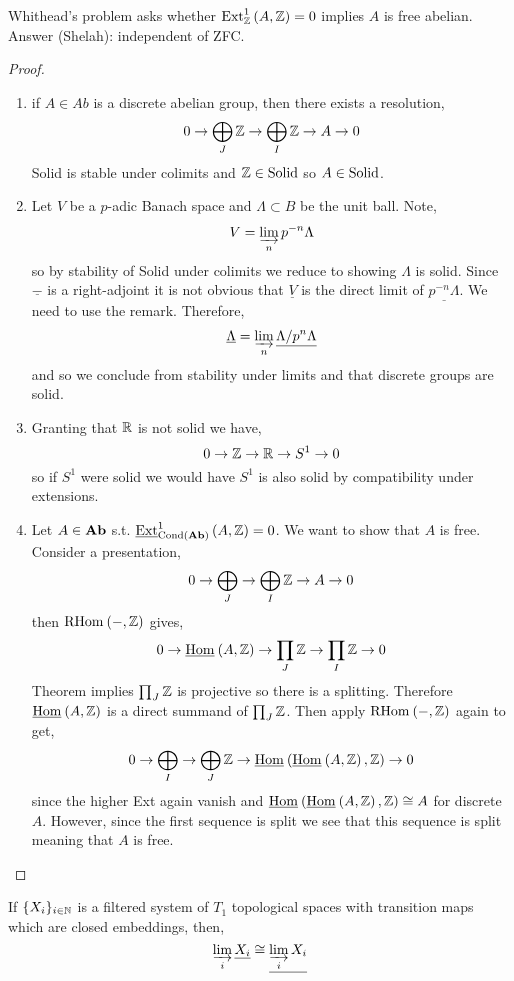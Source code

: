 \documentclass[12pt]{article}
\newcommand{\Cond}{\mathrm{Cond}}
\begin{document}
\begin{rmk}
Whithead's problem asks whether $\mathrm{Ext}^{1}_{\mathbb{Z}} \left( A, \mathbb{Z} \right) = 0$ implies $A$ is free abelian. Answer (Shelah): independent of ZFC. 
\end{rmk}

\begin{proof}
\begin{enumerate}
\item if $A \in Ab$ is a discrete abelian group, then there exists a resolution,
\[ 0 \to \bigoplus_J \mathbb{Z} \to \bigoplus_I \mathbb{Z} \to A \to 0 \]
Solid is stable under colimits and $\mathbb{Z} \in \mathrm{Solid}$ so $A \in \mathrm{Solid}$.

\item Let $V$ be a $p$-adic Banach space and $\Lambda \subset B$ be the unit ball. Note,
\[ V = \operatorname*{\varinjlim}_n p^{-n} \Lambda \]
so by stability of Solid under colimits we reduce to showing $\Lambda$ is solid. Since $\underline{-}$ is a right-adjoint it is not obvious that $\underline{V}$ is the direct limit of $\underline{p^{-n} \Lambda}$. We need to use the remark. Therefore, 
\[ \underline{\Lambda} = \operatorname*{\varinjlim}_n \underline{\Lambda / p^n \Lambda} \]
and so we conclude from stability under limits and that discrete groups are solid.

\item Granting that $\mathbb{R}$ is not solid we have,
\[ 0 \to \mathbb{Z} \to \mathbb{R} \to S^1 \to 0 \]
so if $S^1$ were solid we would have $S^1$ is also solid by compatibility under extensions.

\item Let $A \in \mathbf{Ab}$ s.t. $\uExt{1}{\Cond(\Ab)}{A}{\Z} = 0$. We want to show that $A$ is free. Consider a presentation,
\[ 0 \to \bigoplus_J \to \bigoplus_I \mathbb{Z} \to A \to 0 \]
then $\mathrm{RHom}_{} \left( -, \mathbb{Z} \right)$ gives,
\[ 0 \to \underline{\mathrm{Hom}}_{} \left( A, \mathbb{Z} \right) \to \prod_J \mathbb{Z} \to \prod_I \mathbb{Z} \to 0 \]
Theorem implies $\prod_J \mathbb{Z}$ is projective so there is a splitting. Therefore $\underline{\mathrm{Hom}}_{} \left( A, \mathbb{Z} \right)$ is a direct summand of $\prod_J \mathbb{Z}$. Then apply $\mathrm{RHom}_{} \left( -, \mathbb{Z} \right)$ again to get,
\[ 0 \to \bigoplus_I \to \bigoplus_J \mathbb{Z} \to \underline{\mathrm{Hom}}_{} \left( \underline{\mathrm{Hom}}_{} \left( A, \mathbb{Z} \right), \mathbb{Z} \right) \to 0 \]
since the higher Ext again vanish
and $\underline{\mathrm{Hom}}_{} \left( \underline{\mathrm{Hom}}_{} \left( A, \mathbb{Z} \right), \mathbb{Z} \right) \cong A$ for discrete $A$. However, since the first sequence is split we see that this sequence is split meaning that $A$ is free. 
\end{enumerate}
\end{proof}

\begin{rmk}
If $\{ X_i \}_{i \in \mathbb{N}}$ is a filtered system of $T_1$ topological spaces with transition maps which are closed embeddings, then,
\[ \operatorname*{\varinjlim}_i \underline{X_i} \cong \underline{\operatorname*{\varinjlim}_i X_i} \]
\end{rmk}
\end{document}
